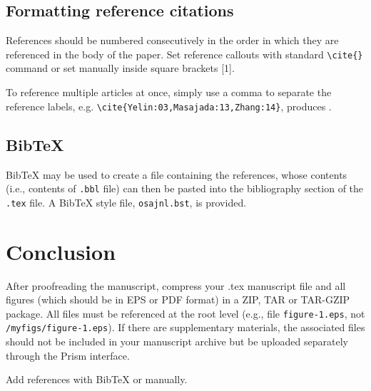 \documentclass{osa-article}
\begin{document}
\subsection{Formatting reference citations}
References should be numbered consecutively in the order in which they are referenced in the body of the paper. Set reference callouts with standard \verb+\cite{}+ command or set manually inside square brackets [1].

To reference multiple articles at once, simply use a comma to separate the reference labels, e.g. \verb+\cite{Yelin:03,Masajada:13,Zhang:14}+, produces \cite{Yelin:03,Masajada:13,Zhang:14}.

\subsection{Bib\TeX}
\label{sec:bibtex}
Bib\TeX{} may be used to create a file containing the references, whose contents (i.e., contents of \texttt{.bbl} file) can then be pasted into the bibliography section of the \texttt{.tex} file. A Bib\TeX{} style file, \texttt{osajnl.bst}, is provided.

\section{Conclusion}
After proofreading the manuscript, compress your .tex manuscript file and all figures (which should be in EPS or PDF format) in a ZIP, TAR or TAR-GZIP package. All files must be referenced at the root level (e.g., file \texttt{figure-1.eps}, not \texttt{/myfigs/figure-1.eps}). If there are supplementary materials, the associated files should not be included in your manuscript archive but be uploaded separately through the Prism interface.


Add references with BibTeX or manually.
\cite{Zhang:14,OSA,FORSTER2007,Dean2006}




\end{document}
